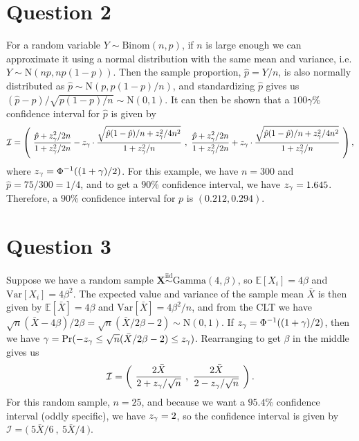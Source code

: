 \documentclass[10pt]{article}
\begin{document}
\section{Question 2} \noindent
For a random variable \(Y \sim \mathrm{Binom}(n, p)\), if \(n\) is large enough we can approximate it using a normal distribution with the same mean and 
variance, i.e. \(Y \sim \mathrm{N}(np, np(1-p))\). Then the sample proportion, \(\hat{p} = Y / n\), is also normally distributed as 
\(\hat{p} \sim \mathrm{N}(p, p(1-p)/n)\), and standardizing \(\hat{p}\) gives us \((\hat{p} - p) / \sqrt{p(1-p)/n} \sim \mathrm{N}(0,1)\). 
It can then be shown that a \(100\gamma\)\%{} confidence interval for \(\hat{p}\) is given by 
\begin{align*}
    \mathcal{I}
    = \left( ~ 
    \frac{\hat{p} + z_{\gamma}^2 / 2n}{1 + z_{\gamma}^2 / 2n} - z_{\gamma} \cdot \frac{\sqrt{\hat{p}(1 - \hat{p}) / n + z_{\gamma}^2 / 4n^2}}{1 + z_{\gamma}^2 / n} 
    ~,~ 
    \frac{\hat{p} + z_{\gamma}^2 / 2n}{1 + z_{\gamma}^2 / 2n} + z_{\gamma} \cdot \frac{\sqrt{\hat{p}(1 - \hat{p}) / n + z_{\gamma}^2 / 4n^2}}{1 + z_{\gamma}^2 / n}
    ~ \right),
\end{align*}
where \(z_{\gamma} = \Phi^{-1}((1 + \gamma)/2)\). For this example, we have \(n = 300\) and \(\hat{p} = 75 / 300 = 1/4\), and to get a \(90\)\%{}
confidence interval, we have \(z_{\gamma} = 1.645\). Therefore, a \(90\)\%{} confidence interval for \(p\) is \((0.212, 0.294)\).

\section{Question 3} \noindent
Suppose we have a random sample \(\bm{X} \overset{\mathrm{iid}}{\sim} \mathrm{Gamma}(4, \beta)\), so \(\mathbb{E}[X_i] = 4\beta\) and \(\mathrm{Var}[X_i] = 4 \beta^2\). The expected 
value and variance of the sample mean \(\bar{X}\) is then given by \(\mathbb{E}[\bar{X}] = 4 \beta\) and \(\mathrm{Var}[\bar{X}] = 4 \beta^2 / n\), and from 
the CLT we have \(\sqrt{n}(\bar{X} - 4 \beta) / 2 \beta = \sqrt{n}(\bar{X} / 2 \beta - 2) \sim \mathrm{N}(0, 1)\). If \(z_{\gamma} = \Phi^{-1}((1 + \gamma) / 2)\),
then we have \(\gamma = \mathrm{Pr} (-z_{\gamma} \le \sqrt{n}(\bar{X} / 2 \beta - 2) \le z_{\gamma})\). Rearranging to get \(\beta\) in the middle gives us 
\begin{align*}
    \mathcal{I}
    = \left( ~ \frac{2 \bar{X}}{2 + z_{\gamma} / \sqrt{n}} ~,~ \frac{2 \bar{X}}{2 - z_{\gamma} / \sqrt{n}} ~ \right).
\end{align*}
For this random sample, \(n = 25\), and because we want a \(95.4\)\%{} confidence interval (oddly specific), we have \(z_{\gamma} = 2\), so the confidence interval 
is given by \(\mathcal{I} = \big( ~ 5 \bar{X} / 6 ~,~ 5 \bar{X} / 4 ~ \big)\). 
\end{document}
